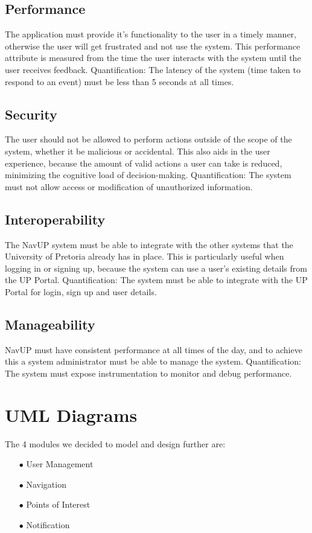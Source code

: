 \documentclass[english]{article}
\begin{document}
	\subsection{Performance}
	The application must provide it's functionality to the user in a timely manner, otherwise the user will get frustrated and not use the system. This performance attribute is measured from the time the user interacts with the system until the user receives feedback.
	\newline
	\newline
	{Quantification:} The latency of the system (time taken to respond to an event) must be less than 5 seconds at all times.
	\subsection{Security}
	The user should not be allowed to perform actions outside of the scope of the system, whether it be malicious or accidental. This also aids in the user experience, because the amount of valid actions a user can take is reduced, minimizing the cognitive load of decision-making.
	\newline
	\newline
	{Quantification:} The system must not allow access or modification of unauthorized information.
	\subsection{Interoperability}
	The NavUP system must be able to integrate with the other systems that the University of Pretoria already has in place. This is particularly useful when logging in or signing up, because the system can use a user's existing details from the UP Portal.
	\newline
	\newline
	{Quantification:} The system must be able to integrate with the UP Portal for login, sign up and user details.
	
	\subsection{Manageability}
	NavUP must have consistent performance at all times of the day, and to achieve this a system administrator must be able to manage the system.
	\newline
	\newline
	{Quantification:} The system must expose instrumentation to monitor and debug performance.
	
	\section{UML Diagrams}
	The 4 modules we decided to model and design further are:
	\begin{itemize}
		\item[$\bullet$] User Management
		\item[$\bullet$] Navigation
		\item[$\bullet$] Points of Interest
		\item[$\bullet$] Notification
	\end{itemize}
		\clearpage
		
\end{document}
